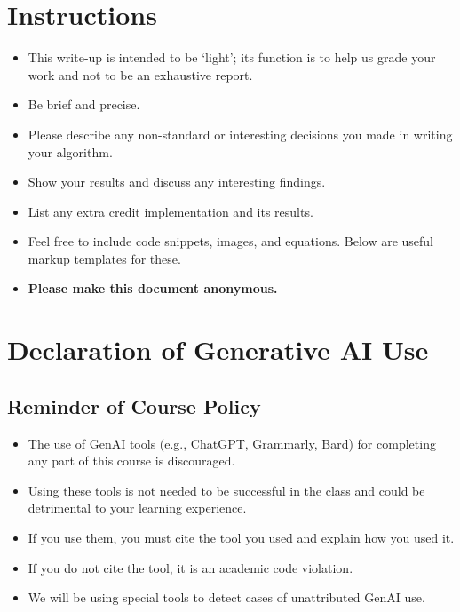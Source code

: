\section*{Instructions}

\begin{itemize}
  \item This write-up is intended to be `light'; its function is to help us grade your work and not to be an exhaustive report.
  \item Be brief and precise.
  \item Please describe any non-standard or interesting decisions you made in writing your algorithm.
  \item Show your results and discuss any interesting findings.
  \item List any extra credit implementation and its results.
  \item Feel free to include code snippets, images, and equations. Below are useful markup templates for these.
  \item \textbf{Please make this document anonymous.}
\end{itemize}

\newpage

\section*{Declaration of Generative AI Use}

\subsection*{Reminder of Course Policy}

\begin{itemize}
    \item The use of GenAI tools (e.g., ChatGPT, Grammarly, Bard) for completing any part of this course is discouraged.
    \item Using these tools is not needed to be successful in the class and could be detrimental to your learning experience.
    \item If you use them, you must cite the tool you used and explain how you used it.
    \item If you do not cite the tool, it is an academic code violation.
    \item We will be using special tools to detect cases of unattributed GenAI use.
\end{itemize}

